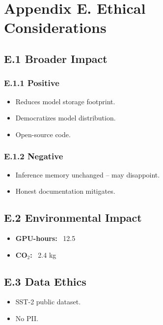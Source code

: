 
\section{Appendix E. Ethical Considerations}

\subsection{E.1 Broader Impact}

\subsubsection{E.1.1 Positive}

\begin{itemize}
\item Reduces model storage footprint.
\item Democratizes model distribution.
\item Open-source code.

\end{itemize}
\subsubsection{E.1.2 Negative}

\begin{itemize}
\item Inference memory unchanged -- may disappoint.
\item Honest documentation mitigates.

\end{itemize}
\subsection{E.2 Environmental Impact}

\begin{itemize}
\item \textbf{GPU-hours:} ~12.5
\item \textbf{CO$_2$:} ~2.4 kg

\end{itemize}
\subsection{E.3 Data Ethics}

\begin{itemize}
\item SST-2 public dataset.
\item No PII.

\end{itemize}
